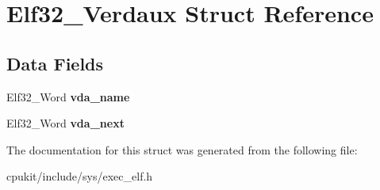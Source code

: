 \hypertarget{structElf32__Verdaux}{}\section{Elf32\+\_\+\+Verdaux Struct Reference}
\label{structElf32__Verdaux}
\subsection*{Data Fields}
\begin{DoxyCompactItemize}
\item 
\mbox{\label{structElf32__Verdaux_a5cec12aee4339964d8956351465efa51}} 
Elf32\+\_\+\+Word {\bfseries vda\+\_\+name}
\item 
\mbox{\label{structElf32__Verdaux_ab3814a03060eab7d93f1f79d93d3fedd}} 
Elf32\+\_\+\+Word {\bfseries vda\+\_\+next}
\end{DoxyCompactItemize}


The documentation for this struct was generated from the following file\+:\begin{DoxyCompactItemize}
\item 
cpukit/include/sys/exec\+\_\+elf.\+h\end{DoxyCompactItemize}
